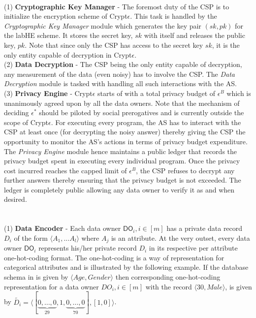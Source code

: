 \\
(1)\textbf{ Cryptographic Key Manager }- The foremost duty of the \textsf{CSP} is to initialize the encryption scheme of Crypt$\epsilon$. This task is handled by the \textit{Cryptographic Key Manager} module which generates the key pair $(sk,pk)$ for the \textsf{labHE} scheme. It stores the secret key, $sk$ with itself and releases the public key, $pk$. Note that since only the \textsf{CSP} has access to the secret key $sk$, it is the only entity capable of decryption in Crypt$\epsilon$.\\
(2)\textbf{ Data Decryption }- The \textsf{CSP} being the only entity capable of decryption,  any measurement of the data (even noisy) has to involve the \textsf{CSP}. The \textit{Data Decryption} module is tasked with handling all such interactions with the \textsf{AS}. \\
(3)\textbf{ Privacy Engine }- Crypt$\epsilon$ starts of with a total privacy budget of $\epsilon^B$ which is unanimously agreed upon by all the data owners. Note that the mechanism of deciding $\epsilon^*$ should be piloted by social prerogatives \cite{e1,e2} 
and is currently outside the scope of Crypt$\epsilon$. For executing every program, the \textsf{AS} has to interact with the \textsf{CSP} at least once (for decrypting the noisy answer) thereby giving the \textsf{CSP} the opportunity to monitor the \textsf{AS}'s actions in terms of privacy budget expenditure. The \textit{Privacy Engine} module hence maintains a public ledger that records the privacy budget spent in executing every individual program. Once the privacy cost incurred reaches the capped limit of $\epsilon^B$, the \textsf{CSP} refuses to decrypt any further answers thereby ensuring that the privacy budget is not exceeded.  The ledger is completely public allowing any data owner to verify it as and when desired.\\\\
\\
(1)\textbf{ Data Encoder} -  Each data owner $\textsf{DO}_i, i \in [m]$ has a private data record $D_i$ of the form $\langle A_1,...A_l\rangle$ where ${A}_j$ is an attribute. At the very outset, every data owner  $\textsf{DO}_i$ represents his/her private record $D_i$ in its respective per attribute one-hot-coding format. The one-hot-coding is a way of representation for categorical attributes and is illustrated by the following example. 
If the database schema in \system is given by  $\langle Age,Gender\rangle$ then corresponding one-hot-coding representation for a data owner $DO_i, i \in [m]$ with the record $\langle 30, Male\rangle$, is given by $\tilde{D_i}=\langle[\underbrace{0,\ldots,0}_{29},1,\underbrace{0,\ldots,0}_{70}],[1,0]\rangle$. \\
